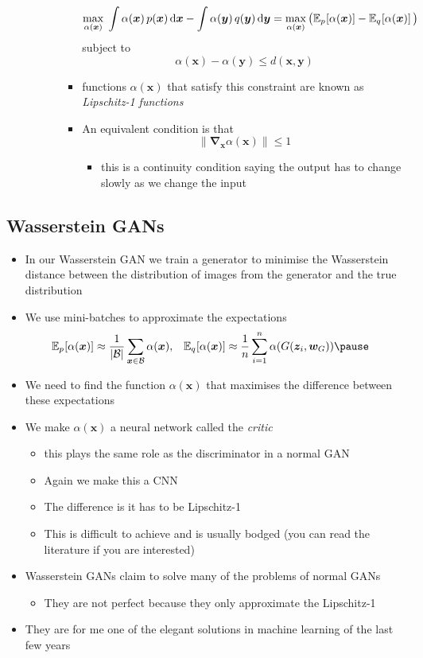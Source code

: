 \documentclass[11pt]{article}
\newcommand{\grad}{\bm{\nabla}}
\newcommand{\av}[2][]{\mathbb{E}_{#1\!}\left[ #2 \right]}
\newcommand{\dd}{\mathrm{d}}
\begin{document}
\begin{itemize}
\begin{itemize}
\begin{itemize}
\begin{itemize}
$$ \max_{\alpha(\bm{x})} \; \int
           \alpha(\bm{x})\,p(\bm{x})\, \dd \bm{x} - \int 
           \alpha(\bm{y})\,q(\bm{y})\,\dd \bm{y} =
           \max_{\alpha(\bm{x})} \left( \av[p]{\alpha(\bm{x})} -
           \av[q]{\alpha(\bm{x})} \strut \right) $$
subject to
$$ \alpha(\bm{x}) - \alpha(\bm{y}) \leq d(\bm{x},\bm{y}) $$
\item functions \(\alpha(\bm{x})\) that satisfy this constraint are
known as \emph{Lipschitz-1 functions}
\item An equivalent condition is that
$$ \| \grad_{\bm{x}} \alpha(\bm{x}) \| \leq 1 $$
\begin{itemize}
\item this is a continuity condition saying the output has to
change slowly as we change the input
\end{itemize}
\end{itemize}
\end{itemize}
\end{itemize}
\end{itemize}

\subsection{Wasserstein GANs}
\label{sec:org65ac536}
\begin{itemize}
\item In our Wasserstein GAN we train a generator to minimise the
Wasserstein distance between the distribution of images from the
generator and the true distribution
\item We use mini-batches to approximate the expectations
  \begin{align*}
   \av[p]{\alpha(\bm{x})}
  &\approx \frac{1}{|\mathcal{B}|}
    \sum_{\bm{x}\in\mathcal{B}} \alpha(\bm{x}),
  &
    \av[q]{\alpha(\bm{x})}
  &\approx \frac{1}{n} \sum_{i=1}^n
    \alpha(G(\bm{z}_i,\bm{w}_G))\pause
\end{align*}
\item We need to find the function \(\alpha(\bm{x})\) that maximises the
difference between these expectations
\item We make \(\alpha(\bm{x})\) a neural network called the \emph{critic}
\begin{itemize}
\item this plays the same role as the discriminator in a normal GAN
\item Again we make this a CNN
\item The difference is it has to be Lipschitz-1
\item This is difficult to achieve and is usually bodged (you can
read the literature if you are interested)
\end{itemize}
\item Wasserstein GANs claim to solve many of the problems of normal
GANs
\begin{itemize}
\item They are not perfect because they only approximate the
Lipschitz-1
\end{itemize}
\item They are for me one of the elegant solutions in machine learning
of the last few years
\end{itemize}
\end{document}
